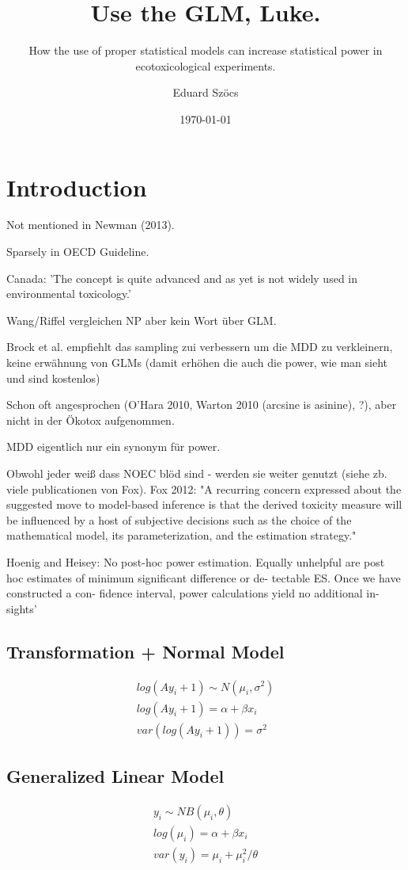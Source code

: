 \documentclass{scrartcl}\usepackage[]{graphicx}\usepackage[]{color}
\title{Use the GLM, Luke.}
\subtitle{How the use of proper statistical models can increase statistical power in ecotoxicological experiments.}
\author{Eduard Szöcs}
\date{\today}
\begin{document}
\maketitle

\section{Introduction}
Not mentioned in Newman (2013). 

Sparsely in OECD Guideline. 

Canada: 'The concept is quite advanced and as yet is not widely used in environmental toxicology.'

Wang/Riffel vergleichen NP aber kein Wort über GLM.

Brock et al. empfiehlt das sampling zui verbessern um die MDD zu verkleinern, keine erwähnung von GLMs (damit erhöhen die auch die power, wie man sieht und sind kostenlos)


Schon oft angesprochen (O'Hara 2010, Warton 2010 (arcsine is asinine), ?), aber nicht in der Ökotox aufgenommen.

MDD eigentlich nur ein synonym für power.

Obwohl jeder weiß dass NOEC blöd sind - werden sie weiter genutzt (siehe zb. viele publicationen von Fox). Fox 2012: "A
recurring concern expressed about the suggested move to
model-based inference is that the derived toxicity measure
will be influenced by a host of subjective decisions such as the
choice of the mathematical model, its parameterization, and
the estimation strategy."

Hoenig and Heisey: No post-hoc power estimation. Equally unhelpful are
post hoc estimates of minimum significant difference or de-
tectable ES. Once we have constructed a con-
fidence interval, power calculations yield no additional in-
sights’


\subsection{Transformation + Normal Model}
\begin{align}
  log(Ay_i + 1) \sim N(\mu_i, \sigma^2) \nonumber \\
  log(Ay_i + 1) = \alpha + \beta x_i \nonumber \\
  var(log(Ay_i + 1)) = \sigma^2 \label{eqn:1}
\end{align}


\subsection{Generalized Linear Model}
\begin{align}
  y_i \sim NB(\mu_i, \theta)  \nonumber \\
  log(\mu_i) = \alpha + \beta x_i   \nonumber \\
  var(y_i) = \mu_i + \mu_i^2 / \theta  \label{eqn:2}
\end{align}
\end{document}
